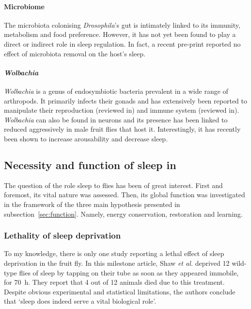 \paragraph*{Microbiome}
The microbiota colonising \emph{Drosophila}'s gut is intimately linked to its immunity, metabolism and food preference\cite{martino_microbial_2017}.
However, it has not yet been found to play a direct or indirect role in sleep regulation.
In fact, a recent pre-print reported no effect of microbiota removal on the host's sleep\cite{selkrig_drosophila_2018}.

\paragraph*{\emph{Wolbachia}}
\emph{Wolbachia} is a genus of endosymbiotic bacteria prevalent in a wide range of arthropods\cite{zug_still_2012}.
It primarily infects their gonads and has extensively been reported to manipulate their reproduction (reviewed in\cite{werren_wolbachia_2008}) and immune system (reviewed in\cite{zug_wolbachia_2015}).
\emph{Wolbachia} can also be found in neurons and its presence has been linked to reduced aggressively in male fruit flies that host it\cite{rohrscheib_wolbachia_2015}.
Interestingly, it has recently been shown to increase arousability and decrease sleep\cite{bi_wolbachia_2018}.


\subsection{Necessity and  function of sleep in \droso{}}

The question of the role sleep to flies has been of great interest.
First and foremost, its vital nature was assessed.
Then, its global function was investigated  in the framework of the
three main hypothesis presented in subsection~\ref{sec:function}. 
Namely, energy conservation, restoration and learning. 


\subsubsection{Lethality of sleep deprivation}
\label{sec:lethality}
To my knowledge, there is only one study reporting a lethal effect of sleep deprivation in the fruit fly\cite{shaw_stress_2002}.
In this milestone article, Shaw \emph{et al.} deprived 12 wild-type flies of sleep by tapping on their tube as soon as they appeared immobile, for 70~h.
They report that 4 out of 12 animals died due to this treatment.
Despite obvious experimental and statistical limitations, the authors conclude that `sleep does indeed serve a vital biological role'\cite{shaw_stress_2002}.

